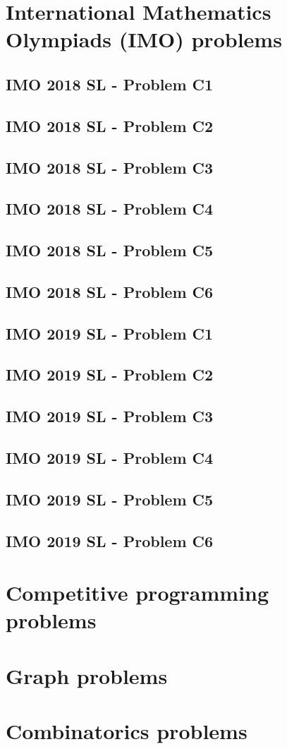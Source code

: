 \documentclass[12pt]{book}
\begin{document}
\section{International Mathematics Olympiads (IMO) problems}

\subsection{IMO 2018 SL - Problem C1}
\subsection{IMO 2018 SL - Problem C2}
\subsection{IMO 2018 SL - Problem C3}
\subsection{IMO 2018 SL - Problem C4}
\subsection{IMO 2018 SL - Problem C5}
\subsection{IMO 2018 SL - Problem C6}

\subsection{IMO 2019 SL - Problem C1}
\subsection{IMO 2019 SL - Problem C2}
\subsection{IMO 2019 SL - Problem C3}
\subsection{IMO 2019 SL - Problem C4}
\subsection{IMO 2019 SL - Problem C5}
\subsection{IMO 2019 SL - Problem C6}

\section{Competitive programming problems}

\section{Graph problems}

\section{Combinatorics problems}
\end{document}
